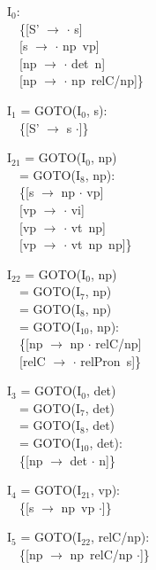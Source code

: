 \begin{figure}[htbp]
  \begin{center}
    {\small
      \begin{minipage}[t]{\mpw}
        I$_{0}$: \\
        　\{[S' $\to$ $\cdot$ s] \\
        　[s $\to$ $\cdot$ np\ vp] \\ 
        　[np $\to$ $\cdot$ det\ n] \\
        　[np $\to$ $\cdot$ np\ relC/np]\}

        \vspace{\vs}
        I$_{1}$ = GOTO(I$_{0}$, s): \\
        　\{[S' $\to$ s $\cdot$]\}

        \vspace{\vs}
        I$_{21}$ = GOTO(I$_{0}$, np) \\
        　= GOTO(I$_{8}$, np): \\
        　\{[s $\to$ np $\cdot$ vp] \\ 
        　[vp $\to$ $\cdot$ vi] \\ 
        　[vp $\to$ $\cdot$ vt\ np] \\
        　[vp $\to$ $\cdot$ vt\ np\ np]\}

        \vspace{\vs}
        I$_{22}$ = GOTO(I$_{0}$, np) \\
        　= GOTO(I$_{7}$, np) \\
        　= GOTO(I$_{8}$, np) \\
        　= GOTO(I$_{10}$, np): \\
        　\{[np $\to$ np $\cdot$ relC/np] \\
        　[relC $\to$ $\cdot$ relPron\ s]\}
      \end{minipage}
      \begin{minipage}[t]{\mpw}
        I$_{3}$ = GOTO(I$_{0}$, det) \\
        　= GOTO(I$_{7}$, det) \\
        　= GOTO(I$_{8}$, det) \\
        　= GOTO(I$_{10}$, det): \\
        　\{[np $\to$ det $\cdot$ n]\}

        \vspace{\vs}
        I$_{4}$ = GOTO(I$_{21}$, vp): \\
        　\{[s $\to$ np\ vp $\cdot$]\}

        \vspace{\vs}
        I$_{5}$ = GOTO(I$_{22}$, relC/np): \\
        　\{[np $\to$ np\ relC/np $\cdot$]\} 


\end{minipage}}
\end{center}
\end{figure}
